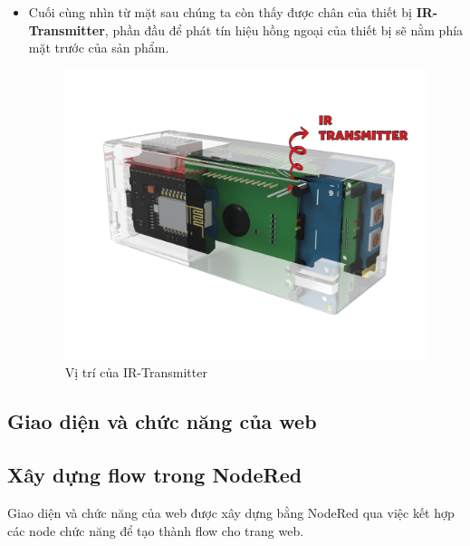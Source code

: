 \documentclass{report}
\begin{document}
\begin{itemize}
    \pagebreak
    \item Cuối cùng nhìn từ mặt sau chúng ta còn thấy được chân của thiết bị  \textbf{IR-Transmitter}, phần đầu để phát tín hiệu hồng ngoại của thiết bị sẽ nằm phía mặt trước của sản phẩm.
    \begin{figure}[H]
        \includegraphics[width=\textwidth, keepaspectratio]{img/4-01.png}
        \centering
        \caption{Vị trí của IR-Transmitter}
    \end{figure}

    
\end{itemize}

\newpage
\subsection{Giao diện và chức năng của web}
\subsection{Xây dựng flow trong NodeRed}
Giao diện và chức năng của web được xây dựng bằng NodeRed qua việc kết hợp các node chức năng để  tạo thành flow cho trang web.
\end{document}
